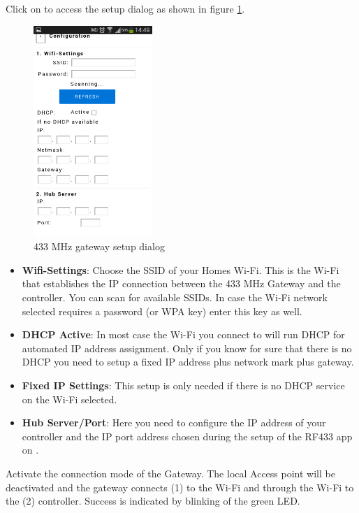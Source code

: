 Click on  to access the setup dialog as shown in figure \ref{433_3}.

\begin{figure}
\begin{center}
\includegraphics[width=0.4\textwidth]{pngs/cap9/433_3.png}
\caption{433 MHz gateway setup dialog}
\label{433_3}
\end{center}
\end{figure}

\begin{itemize}
\item \textbf{Wifi-Settings}: Choose the SSID of your Homes Wi-Fi. This is the Wi-Fi that 
establishes the IP connection between the 433 MHz Gateway and the \zway controller.
You can scan for available SSIDs. In case the Wi-Fi network selected requires a password 
(or WPA key) enter this key as well. \item \textbf{DHCP Active}: In most case the Wi-Fi 
you connect to will run DHCP for automated IP address assignment. Only if you know for 
sure that there is no DHCP you need to setup a fixed IP address plus network mark plus 
gateway.
\item \textbf{Fixed IP Settings}: This setup is only needed if there is no DHCP service 
on the Wi-Fi selected.
\item \textbf{Hub Server/Port}: Here you need to configure the IP address of your 
\zway controller and the IP port address chosen during the setup of the RF433 app on \zway.
\end{itemize}

Activate the connection mode of the Gateway. The local Access point will be deactivated 
and the gateway connects (1) to the Wi-Fi and through the Wi-Fi to the (2) \zway controller. 
Success is indicated by blinking of the green LED.

